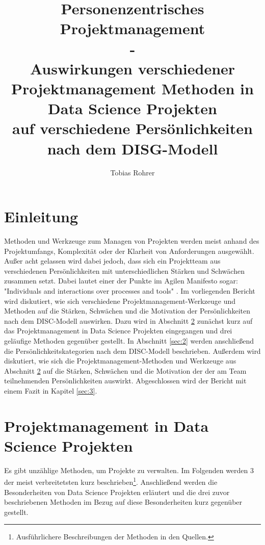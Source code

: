 \documentclass[twocolumn,10pt]{asme2ej}
\title{%
	Personenzentrisches Projektmanagement\\
	\large 
	- \\
	Auswirkungen verschiedener Projektmanagement Methoden in Data Science Projekten\\ 
   auf verschiedene Persönlichkeiten nach dem DISG-Modell}
\author{Tobias Rohrer
    \affiliation{
	Hochschule Darmstadt\\
	Data Science (Master)\\
    Email: sttorohr@stud.h-da.de
    }	
}
\begin{document}
\maketitle    

\begin{abstract}


\end{abstract}

\section{Einleitung}
Methoden und Werkzeuge zum Managen von Projekten werden meist anhand des Projektumfangs, Komplexität oder der Klarheit von Anforderungen ausgewählt. Außer acht gelassen wird dabei jedoch, dass sich ein Projektteam aus verschiedenen Persönlichkeiten mit unterschiedlichen Stärken und Schwächen zusammen setzt. Dabei lautet einer der Punkte im Agilen Manifesto sogar: "Individuals and interactions over processes and tools" \cite{beck2001agile}. Im vorliegenden Bericht wird diskutiert, wie sich verschiedene Projektmanagement-Werkzeuge und Methoden auf die Stärken, Schwächen und die Motivation der Persönlichkeiten nach dem DISC-Modell auswirken. Dazu wird in Abschnitt \ref{sec:1} zunächst kurz auf das Projektmanagement in Data Science Projekten eingegangen und drei geläufige Methoden gegenüber gestellt. In Abschnitt \ref{sec:2} werden anschließend die Persönlichkeitskategorien nach dem DISC-Modell beschrieben. Außerdem wird diskutiert, wie sich die Projektmanagement-Methoden und Werkzeuge aus Abschnitt \ref{sec:1} auf die Stärken, Schwächen und die Motivation der der am Team teilnehmenden Persönlichkeiten auswirkt. Abgeschlossen wird der Bericht mit einem Fazit in Kapitel \ref{sec:3}.


\section{Projektmanagement in Data Science Projekten}\label{sec:1}
Es gibt unzählige Methoden, um Projekte zu verwalten. Im Folgenden werden 3 der meist verbreitetsten kurz beschrieben\footnote{Ausführlichere Beschreibungen der Methoden in den Quellen.}. Anschließend werden die Besonderheiten von Data Science Projekten erläutert und die drei zuvor beschriebenen Methoden im Bezug auf diese Besonderheiten kurz gegenüber gestellt.
\end{document}
